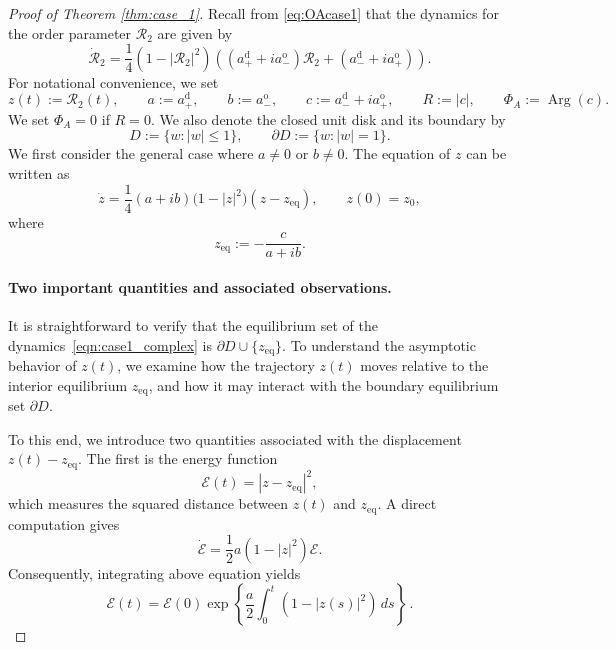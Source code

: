 \documentclass[10pt]{article}
\theoremstyle{definition}
\theoremstyle{definition}
\numberwithin{equation}{section}
\newcommand{\CE}{\mathcal{E}}
\newcommand{\CR}{\mathcal{R}}
\newcommand{\aDPlus}{a_+^{\text{d}}}
\newcommand{\aDMinus}{a_-^{\text{d}}}
\newcommand{\aOPlus}{a_+^{\text{o}}}
\newcommand{\aOMinus}{a_-^{\text{o}}}
\newcommand{\Arg}{\operatorname{Arg}}
\newcommand{\zeq}{z_{\mathrm{eq}}}
\newcommand{\PhiA}{\Phi_{A}}
\begin{document}
\begin{proof}[Proof of Theorem \ref{thm:case_1}]
Recall from \eqref{eq:OAcase1} that the dynamics for the order parameter $\CR_2$ are given by
\begin{equation}\label{eq:case1_CR2_dyn_app}
\Dot{\CR}_2 = \frac{1}{4} \left( 1 - |\CR_2|^2 \right) \left( \left(\aDPlus + i\aOMinus \right) \CR_2 + \left( \aDMinus + i\aOPlus \right) \right).
\end{equation}
For notational convenience, we set
\begin{equation}\label{eq:case1_convenience_notation}
z(t) := \CR_2(t), \qquad a:=\aDPlus,\qquad b:=\aOMinus,\qquad c:=\aDMinus+i\aOPlus,\qquad R:=|c|, \qquad \PhiA := \Arg(c) .
\end{equation}
We set $\PhiA = 0$ if $R = 0$.
We also denote the closed unit disk and its boundary by
\[
    D := \{w : |w| \leq 1\}, \qquad \partial D := \{ w : |w| = 1 \}.
\]
We first consider the general case where $a \neq 0$ or $b \neq 0$. 
The equation of $z$ can be written as
\begin{equation}
\label{eqn:case1_complex}
\dot z=\frac{1}{4} (a+ib) \bigl(1-|z|^2\bigr) (z - z_\mathrm{eq}),\qquad z(0)=z_0, 
\end{equation}
where 
\begin{equation}\label{eq:zeq}
z_\mathrm{eq} := -\frac {c}{a + ib} .
\end{equation}

\paragraph{Two important quantities and associated observations.}
It is straightforward to verify that the equilibrium set of the dynamics~\eqref{eqn:case1_complex} is $\partial D \cup \{ z_{\mathrm{eq}} \}$.
To understand the asymptotic behavior of $z(t)$, we examine how the trajectory $z(t)$ moves relative to the interior equilibrium $\zeq$, and how it may interact with the boundary equilibrium set $\partial D$.

To this end, we introduce two quantities associated with the displacement $z(t) - \zeq$.
The first is the energy function
\begin{equation}\label{eq:case1_energy}
    \CE(t) = |z - z_\mathrm{eq}|^2,
\end{equation}
which measures the squared distance between $z(t)$ and $\zeq$.
A direct computation gives
\begin{equation}
    \label{eq:case1_lyapunov_derivative}
    \dot{\CE} = \frac 1 2 a(1 - |z|^2) \CE .
\end{equation}  
Consequently, integrating above equation yields
\begin{equation}\label{eq:energy_CE}
\CE(t) = \CE(0) \exp \left\{ \frac{a}{2} \int_0^t (1 - |z(s)|^2) \, ds \right \} \, .
\end{equation}


\end{proof}
\end{document}
